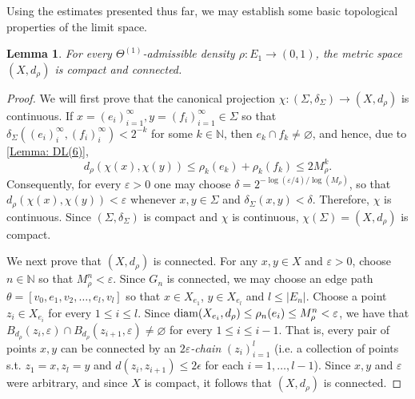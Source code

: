 \documentclass{amsart}
\newcommand{\diam}{{\rm diam}}
\newtheorem{lemma}[equation]{Lemma}
\numberwithin{equation}{section}
\theoremstyle{definition}
\theoremstyle{remark}
\newcommand{\N}{\mathbb{N}}
\begin{document}
Using the estimates presented thus far, we may establish some basic topological properties of the limit space.

\begin{lemma}\label{Lemma: Compact and Connected}
    For every \(\Theta^{(1)}\)-admissible density \(\rho\colon E_1\to (0,1)\), the metric space \((X,d_\rho)\) is compact and connected.

\end{lemma}
\begin{proof}
We will first prove that the canonical projection \(\chi\colon (\Sigma,\delta_\Sigma)\to(X,d_\rho)\) is continuous. If \(x=(e_i)_{i=1}^{\infty},y=(f_i)_{i=1}^\infty\in\Sigma\) so that \(\delta_\Sigma((e_i)_i^{\infty},(f_i)_i^\infty)<2^{-k}\) for some \(k\in\N\), then \(e_k\cap f_k\neq \varnothing\), and hence, due to \ref{Lemma: DL(6)},
    \[
        d_\rho(\chi(x),\chi(y))\leq\rho_k(e_k)+\rho_k(f_k)\leq 2M_\rho^k.
    \]
Consequently, for every \(\varepsilon>0\) one may choose \(\delta=2^{-\log(\varepsilon/4)/\log(M_\rho)}\), so that \(d_\rho(\chi(x),\chi(y))<\varepsilon\) whenever \(x,y\in\Sigma\) and \(\delta_\Sigma(x,y)<\delta\). Therefore, \(\chi\) is continuous. Since \((\Sigma,\delta_\Sigma)\) is compact and \(\chi\) is continuous,  \(\chi(\Sigma)=(X,d_\rho)\) is compact.


We next prove that \((X,d_\rho)\) is connected. For any \(x,y\in X\) and \(\varepsilon>0\), choose \(n\in\N\) so that \(M_\rho^n<\varepsilon\). Since \(G_n\) is connected, we may choose an edge path \(\theta=[v_0,e_1,v_2,\ldots,e_l,v_l]\) so that \(x\in X_{e_1}\), \(y\in X_{e_l}\) and \(l\leq \lvert E_n\rvert\). Choose a point \(z_i\in X_{e_i}\) for every \(1\leq i\leq l\). Since \(\diam(X_{e_i},d_\rho)\leq \rho_n(e_i)\leq M_\rho^n<\varepsilon\), we have that \(B_{d_\rho}(z_i,\varepsilon)\cap B_{d_\rho}(z_{i+1},\varepsilon) \neq \varnothing \) for every \(1\leq i\leq i-1\).  That is, every pair of points $x,y$ can be connected by an \emph{$2\varepsilon$-chain} $(z_i)_{i=1}^l$ (i.e. a collection of points s.t. $z_1=x,z_l =y$ and $d(z_i,z_{i+1})\leq 2\epsilon$ for each $i=1,\dots, l-1$). Since \(x,y\) and \(\varepsilon\) were arbitrary, and since $X$ is compact, it follows that \((X,d_\rho)\) is connected.
\end{proof}
\end{document}
